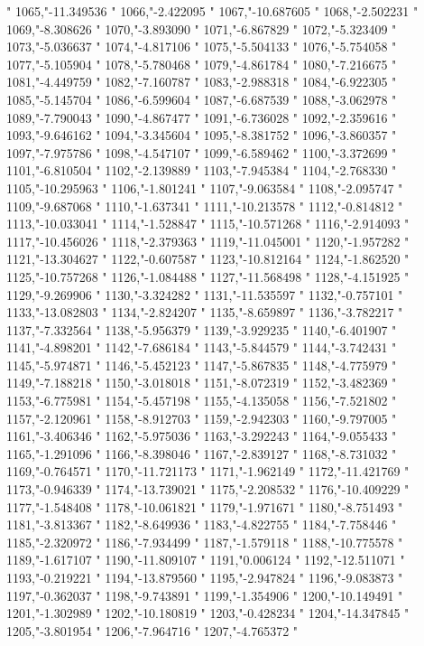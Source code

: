 "
1065,"-11.349536
"
1066,"-2.422095
"
1067,"-10.687605
"
1068,"-2.502231
"
1069,"-8.308626
"
1070,"-3.893090
"
1071,"-6.867829
"
1072,"-5.323409
"
1073,"-5.036637
"
1074,"-4.817106
"
1075,"-5.504133
"
1076,"-5.754058
"
1077,"-5.105904
"
1078,"-5.780468
"
1079,"-4.861784
"
1080,"-7.216675
"
1081,"-4.449759
"
1082,"-7.160787
"
1083,"-2.988318
"
1084,"-6.922305
"
1085,"-5.145704
"
1086,"-6.599604
"
1087,"-6.687539
"
1088,"-3.062978
"
1089,"-7.790043
"
1090,"-4.867477
"
1091,"-6.736028
"
1092,"-2.359616
"
1093,"-9.646162
"
1094,"-3.345604
"
1095,"-8.381752
"
1096,"-3.860357
"
1097,"-7.975786
"
1098,"-4.547107
"
1099,"-6.589462
"
1100,"-3.372699
"
1101,"-6.810504
"
1102,"-2.139889
"
1103,"-7.945384
"
1104,"-2.768330
"
1105,"-10.295963
"
1106,"-1.801241
"
1107,"-9.063584
"
1108,"-2.095747
"
1109,"-9.687068
"
1110,"-1.637341
"
1111,"-10.213578
"
1112,"-0.814812
"
1113,"-10.033041
"
1114,"-1.528847
"
1115,"-10.571268
"
1116,"-2.914093
"
1117,"-10.456026
"
1118,"-2.379363
"
1119,"-11.045001
"
1120,"-1.957282
"
1121,"-13.304627
"
1122,"-0.607587
"
1123,"-10.812164
"
1124,"-1.862520
"
1125,"-10.757268
"
1126,"-1.084488
"
1127,"-11.568498
"
1128,"-4.151925
"
1129,"-9.269906
"
1130,"-3.324282
"
1131,"-11.535597
"
1132,"-0.757101
"
1133,"-13.082803
"
1134,"-2.824207
"
1135,"-8.659897
"
1136,"-3.782217
"
1137,"-7.332564
"
1138,"-5.956379
"
1139,"-3.929235
"
1140,"-6.401907
"
1141,"-4.898201
"
1142,"-7.686184
"
1143,"-5.844579
"
1144,"-3.742431
"
1145,"-5.974871
"
1146,"-5.452123
"
1147,"-5.867835
"
1148,"-4.775979
"
1149,"-7.188218
"
1150,"-3.018018
"
1151,"-8.072319
"
1152,"-3.482369
"
1153,"-6.775981
"
1154,"-5.457198
"
1155,"-4.135058
"
1156,"-7.521802
"
1157,"-2.120961
"
1158,"-8.912703
"
1159,"-2.942303
"
1160,"-9.797005
"
1161,"-3.406346
"
1162,"-5.975036
"
1163,"-3.292243
"
1164,"-9.055433
"
1165,"-1.291096
"
1166,"-8.398046
"
1167,"-2.839127
"
1168,"-8.731032
"
1169,"-0.764571
"
1170,"-11.721173
"
1171,"-1.962149
"
1172,"-11.421769
"
1173,"-0.946339
"
1174,"-13.739021
"
1175,"-2.208532
"
1176,"-10.409229
"
1177,"-1.548408
"
1178,"-10.061821
"
1179,"-1.971671
"
1180,"-8.751493
"
1181,"-3.813367
"
1182,"-8.649936
"
1183,"-4.822755
"
1184,"-7.758446
"
1185,"-2.320972
"
1186,"-7.934499
"
1187,"-1.579118
"
1188,"-10.775578
"
1189,"-1.617107
"
1190,"-11.809107
"
1191,"0.006124
"
1192,"-12.511071
"
1193,"-0.219221
"
1194,"-13.879560
"
1195,"-2.947824
"
1196,"-9.083873
"
1197,"-0.362037
"
1198,"-9.743891
"
1199,"-1.354906
"
1200,"-10.149491
"
1201,"-1.302989
"
1202,"-10.180819
"
1203,"-0.428234
"
1204,"-14.347845
"
1205,"-3.801954
"
1206,"-7.964716
"
1207,"-4.765372
"
